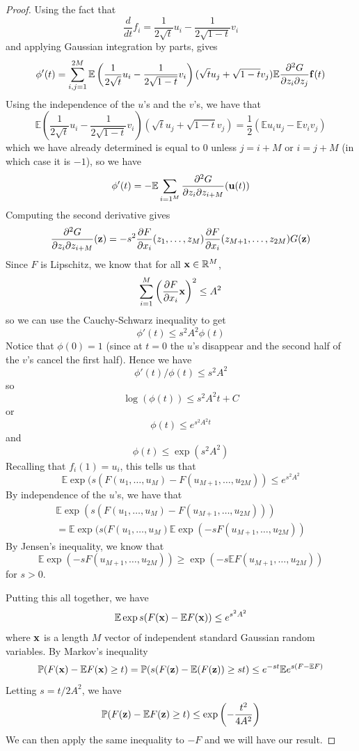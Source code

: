 \documentclass[12pt]{report}
\theoremstyle{definition}
\begin{document}
\begin{proof}
Using the fact that 
$$
\frac{d}{dt} f_i=\frac{1}{2\sqrt{t}}u_i-\frac{1}{2\sqrt{1-t}}v_i
$$
and applying Gaussian integration by parts, gives 
$$
\phi'(t)=\sum_{i,j=1}^{2M}\mathbb{E}\left(\frac{1}{2\sqrt{t}}u_i-\frac{1}{2\sqrt{1-t}}v_i\right)(\sqrt{t}u_j+\sqrt{1-t}v_j)\mathbb{E}\frac{\partial ^2 G}{\partial z_i\partial{z_j}}{\bf f}(t)
$$
Using the independence of the $u$'s and the $v$'s, we have that 
$$
\mathbb{E}\left(\frac{1}{2\sqrt{t}}u_i-\frac{1}{2\sqrt{1-t}}v_i\right)(\sqrt{t}u_j+\sqrt{1-t}v_j)=\frac{1}{2}(\mathbb{E}u_iu_j-\mathbb{E}v_iv_j)
$$
which we have already determined is equal to $0$ unless $j=i+M$ or $i=j+M$ (in which case it is $-1$), so we have 
$$
\phi'(t)=-\mathbb{E}\sum_{i=1^M}\frac{\partial ^2 G}{\partial z_i\partial z_{i+M}}({\bf u}(t))
$$
Computing the second derivative gives 
$$
\frac{\partial ^2 G}{\partial z_i\partial z_{i+M}}({\bf z})=-s^2\frac{\partial F}{\partial x_i}(z_1,\dots, z_M)\frac{\partial F}{\partial x_i}(z_{M+1},\dots, z_{2M}) G({\bf z})
$$
Since $F$ is Lipschitz, we know that for all ${\bf x}\in\mathbb{R}^M$, 
$$
\sum_{i=1}^M \left(\frac{\partial F}{\partial x_i}{\bf x}\right)^2\leq A^2
$$
so we can use the Cauchy-Schwarz inequality to get 
$$
\phi '(t)\leq s^2 A^2\phi(t)
$$
Notice that $\phi(0)=1$ (since at $t=0$ the $u$'s disappear and the second half of the $v$'s cancel the first half).
Hence we have
$$
\phi '(t)/\phi(t) \leq s^2A^2
$$
so 
$$
\log(\phi(t))\leq s^2A^2t + C
$$
or 
$$
\phi(t)\leq e^{s^2 A^2t}
$$
and 
$$
\phi(t)\leq \exp(s^2 A^2)
$$
Recalling that $f_i(1)=u_i$, this tells us that 
$$
\mathbb{E}\exp(s(F(u_1,\dots, u_M)-F(u_{M+1},\dots, u_{2M}))\leq e^{s^2 A^2}
$$
By independence of the $u$'s, we have that 
\begin{multline}
\mathbb{E}\exp(s(F(u_1,\dots, u_M)-F(u_{M+1},\dots, u_{2M}))) \\ =\mathbb{E}\exp(s(F(u_1,\dots, u_M)\mathbb{E}\exp(-sF(u_{M+1},\dots, u_{2M}))
\end{multline}
By Jensen's inequality, we know that 
$$
\mathbb{E}\exp(-sF(u_{M+1},\dots, u_{2M}))\geq \exp(-s\mathbb{E}F(u_{M+1},\dots,u_{2M}))
$$ for $s>0$.

Putting this all together, we have 
$$
\mathbb{E}\exp s(F({\bf x})-\mathbb{E}F({\bf x}))\leq e^{s^2A^2}
$$
where ${\bf x}$ is a length $M$ vector of independent standard Gaussian random variables.  
By Markov's inequality 
$$
\mathbb{P}(F({\bf x})-\mathbb{E}F({\bf x})\geq t)=\mathbb{P}(s(F({\bf z})-\mathbb{E}(F({\bf z}))\geq st)\leq e^{-st}\mathbb{E}e^{s(F-\mathbb{E}F)}
$$
Letting $s=t/2A^2$, we have 
$$
\mathbb{P}(F({\bf z})-\mathbb{E}F({\bf z})\geq t)\leq \exp\left (-\frac{t^2}{4A^2}\right)
$$
We can then apply the same inequality to $-F$ and we will have our result.
\end{proof}
\end{document}
